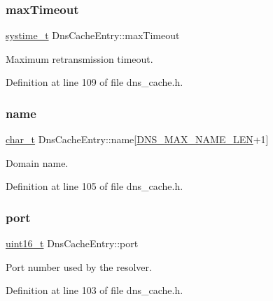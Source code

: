 \subsubsection{\texorpdfstring{max\+Timeout}{maxTimeout}}
{\footnotesize\ttfamily \hyperlink{compiler__port_8h_ae3e32a98d431a02106616da3071832dd}{systime\+\_\+t} Dns\+Cache\+Entry\+::max\+Timeout}



Maximum retransmission timeout. 



Definition at line 109 of file dns\+\_\+cache.\+h.

\mbox{\label{structDnsCacheEntry_a81b2ed3b8465dd82a249f7141865dae6}} 
\subsubsection{\texorpdfstring{name}{name}}
{\footnotesize\ttfamily \hyperlink{compiler__port_8h_a40bb5262bf908c328fbcfbe5d29d0201}{char\+\_\+t} Dns\+Cache\+Entry\+::name\mbox{[}\hyperlink{dns__cache_8h_a7e65f1dc9786665c3a432eabe2972bc4}{D\+N\+S\+\_\+\+M\+A\+X\+\_\+\+N\+A\+M\+E\+\_\+\+L\+EN}+1\mbox{]}}



Domain name. 



Definition at line 105 of file dns\+\_\+cache.\+h.

\mbox{\label{structDnsCacheEntry_a694ec8e23fd08f447e85244478ace829}} 
\subsubsection{\texorpdfstring{port}{port}}
{\footnotesize\ttfamily \hyperlink{stdint_8h_a273cf69d639a59973b6019625df33e30}{uint16\+\_\+t} Dns\+Cache\+Entry\+::port}



Port number used by the resolver. 



Definition at line 103 of file dns\+\_\+cache.\+h.

\mbox{\label{structDnsCacheEntry_aeb800b57a9593f4749e3ae8ac03f4a71}} 
